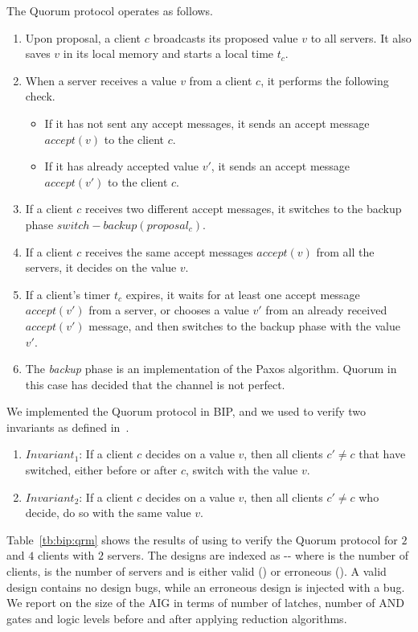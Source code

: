 The Quorum protocol operates as follows.
\begin{enumerate}
 \item Upon proposal, a client $c$ broadcasts its proposed value 
 $v$ to all servers. It also saves $v$ in its local memory and starts a local time
 $t_c$. 
 \item When a server receives a value $v$ from a client $c$, it performs
 the following check.
 \begin{itemize}
  \item If it has not sent any accept messages, it sends an accept message
  $accept(v)$ to the client $c$. 
  \item If it has already accepted value $v'$, it sends an accept message
  $accept(v')$ to the client $c$. 
 \end{itemize}
 \item If a client $c$ receives two different accept messages, it switches
 to the backup phase $switch-backup(proposal_c)$.
 \item If a client $c$ receives the same accept messages $accept(v)$ from all the servers,
 it decides on the value $v$.
 \item If a client's timer $t_c$ expires, it waits for at least
 one accept message $accept(v')$ from a server, or chooses a value $v'$
 from an already received $accept(v')$ message, and then switches to 
 the backup phase with the value $v'$. 
 \item The {\em backup} phase is an implementation of the Paxos algorithm. Quorum in this
 case has decided that the channel is not perfect. 
\end{enumerate}

We implemented the Quorum protocol in BIP, and we used \biptool{} to verify 
two invariants as defined in~\cite{guerraoui2012speculative}.
\begin{enumerate}
 \item $Invariant_1$: If a client $c$ decides on a value $v$, then all clients 
 $c' \neq c$ that have switched, either before or after $c$, switch with the value $v$.
 \item $Invariant_2$: If a client $c$ decides on a value $v$, then all clients
 $c' \neq c$ who decide, do so with the same value $v$. 
\end{enumerate}

Table~\ref{tb:bip:qrm} shows the results of using \biptool{} to verify the 
Quorum protocol for $2$ and $4$ clients with $2$ servers. The designs
are indexed as -- where 
 is the number of clients,  is the number of 
servers and  is either valid () or erroneous ().
A valid design contains no design bugs, while an erroneous design is injected
with a bug. We report on the size of the AIG in terms of number of latches,
number of AND gates and logic levels before and after
applying reduction algorithms.

